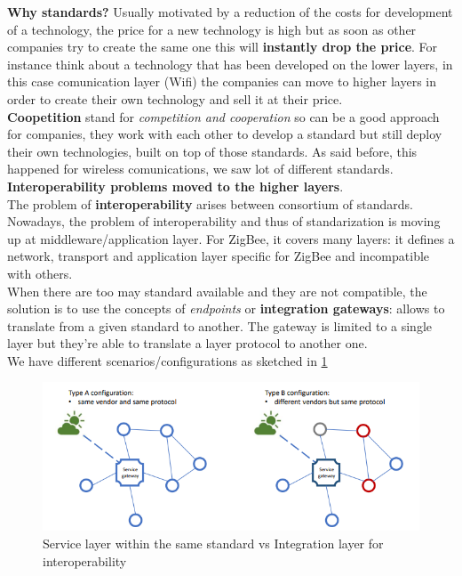 \documentclass[10pt,a4paper]{report}
\theoremstyle{definition}
\begin{document}
\textbf{Why standards?}
Usually motivated by a reduction of the costs for development of a technology, the price for a new technology is high but as soon as other companies try to create the same one this will \textbf{instantly drop the price}. For instance think about a technology that has been developed on the lower layers, in this case comunication layer (Wifi) the companies can move to higher layers in order to create their own technology and sell it at their price.\\
\textbf{Coopetition} stand for \textit{competition and cooperation} so can be a good approach for companies, they work with each other to develop a standard but still deploy their own technologies, built on top of those standards. As said before, this happened for wireless comunications, we saw lot of different standards. \textbf{Interoperability problems moved to the higher layers}.\\
The problem of \textbf{interoperability} arises between consortium of standards.  Nowadays, the problem of interoperability and thus of standarization is moving up at middleware/application layer.
For ZigBee, it covers many layers: it defines a network, transport and application layer specific for ZigBee and incompatible with others.\\
When there are too may standard available and they are not compatible, the solution is to use the concepts of \textit{endpoints} or \textbf{integration gateways}: allows to translate from a given standard to another. The gateway is limited to a single layer but they're able to translate a layer protocol to another one.\\
We have different scenarios/configurations as sketched in \ref{two-type-conf}
\begin{figure}[h]
	\centering
	\includegraphics[scale=0.70]{images/Pasted image 20230228112347.png}
	\caption{Service layer within the same standard vs Integration layer for interoperability}
	\label{two-type-conf}\end{figure}
\end{document}
